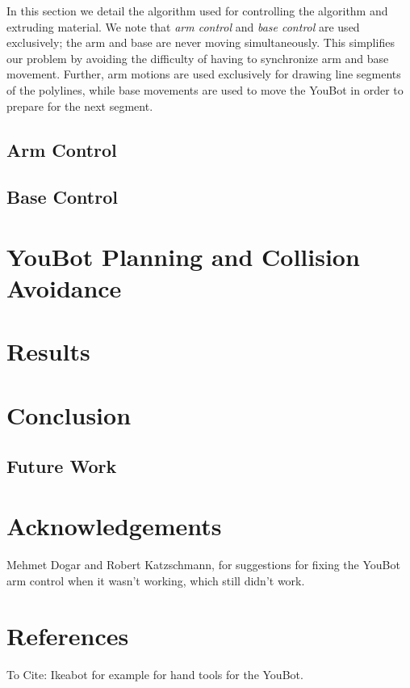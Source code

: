 \documentclass[conference]{acmsiggraph}
\begin{document}
In this section we detail the algorithm used for controlling the algorithm and extruding material.  We note that \emph{arm control} and \emph{base control} are used exclusively; the arm and base are never moving simultaneously.  This simplifies our problem by avoiding the difficulty of having to synchronize arm and base movement.  Further, arm motions are used exclusively for drawing line segments of the polylines, while base movements are used to move the YouBot in order to prepare for the next segment.

\subsection{Arm Control}

\subsection{Base Control}

\section{YouBot Planning and Collision Avoidance}

\section{Results}

\section{Conclusion}

\subsection{Future Work}



\section*{Acknowledgements}

Mehmet Dogar and Robert Katzschmann, for suggestions for fixing the YouBot arm control when it wasn't working, which still didn't work.

\section{References}
To Cite:
Ikeabot for example for hand tools for the YouBot.




\end{document}
